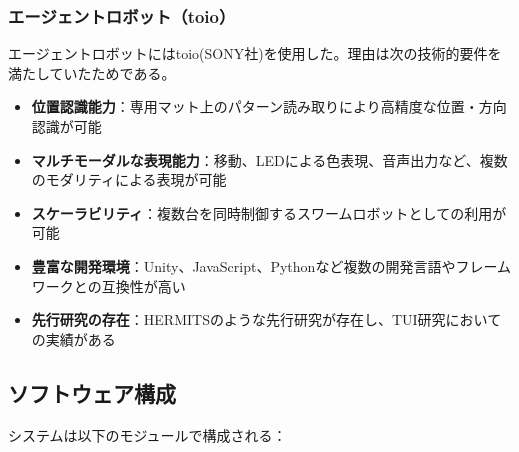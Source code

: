 \documentclass{cuxarticle}
\begin{document}
\subsubsection{エージェントロボット（toio）}
エージェントロボットにはtoio(SONY社)\cite{--小さなキ}を使用した。理由は次の技術的要件を満たしていたためである。

\begin{itemize}
  \item \textbf{位置認識能力}：専用マット上のパターン読み取りにより高精度な位置・方向認識が可能
  \item \textbf{マルチモーダルな表現能力}：移動、LEDによる色表現、音声出力など、複数のモダリティによる表現が可能
  \item \textbf{スケーラビリティ}：複数台を同時制御するスワームロボットとしての利用が可能
  \item \textbf{豊富な開発環境}：Unity、JavaScript、Pythonなど複数の開発言語やフレームワークとの互換性が高い
  \item \textbf{先行研究の存在}：HERMITS\cite{--HERMITSProceedings33rdAnnual}のような先行研究が存在し、TUI研究においての実績がある
\end{itemize}

\subsection{ソフトウェア構成}
システムは以下のモジュールで構成される：
\end{document}
